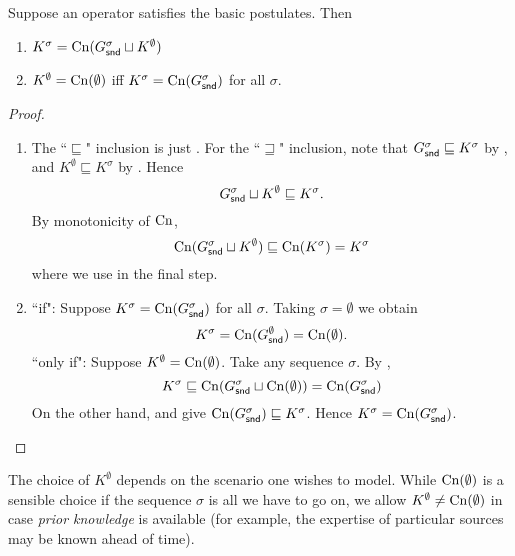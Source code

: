 \begin{proposition}
    \label{kr_prop_prior_knowledge}
    Suppose an operator satisfies the basic postulates. Then
    \begin{enumerate}
        \item $K^\sigma = \operatorname{Cn}(G^\sigma_{\mathsf{snd}} \sqcup K^\emptyset)$
        \item $K^\emptyset = \operatorname{Cn}(\emptyset)$ iff $K^\sigma =
              \operatorname{Cn}(G^\sigma_{\mathsf{snd}})$ for all $\sigma$.
    \end{enumerate}
\end{proposition}

\begin{proof}
    \leavevmode
    \begin{enumerate}
        \item The ``$\sqsubseteq$" inclusion is just \kbound{}.
              For the ``$\sqsupseteq$" inclusion, note that $G^\sigma_{\mathsf{snd}}
              \sqsubseteq K^\sigma$ by \soundness{}, and $K^\emptyset
              \sqsubseteq K^\sigma$ by \priorext{}. Hence
              \[
                  G^\sigma_{\mathsf{snd}} \sqcup K^\emptyset
                  \sqsubseteq
                  K^\sigma.
              \]
              By monotonicity of $\operatorname{Cn}$,
              \[
                  \operatorname{Cn}(G^\sigma_{\mathsf{snd}} \sqcup K^\emptyset)
                  \sqsubseteq
                  \operatorname{Cn}(K^\sigma)
                  = K^\sigma
              \]
              where we use \closure{} in the final step.

          \item ``if": Suppose $K^\sigma = \operatorname{Cn}(G^\sigma_{\mathsf{snd}})$ for all
                $\sigma$. Taking $\sigma = \emptyset$ we obtain
                \[
                    K^\sigma = \operatorname{Cn}(G^\emptyset_{\mathsf{snd}}) = \operatorname{Cn}(\emptyset).
                \]
                ``only if": Suppose $K^\emptyset = \operatorname{Cn}(\emptyset)$. Take any
                sequence $\sigma$. By \kbound{},
                \[
                    K^\sigma
                    \sqsubseteq \operatorname{Cn}(G^\sigma_{\mathsf{snd}} \sqcup \operatorname{Cn}(\emptyset))
                    = \operatorname{Cn}(G^\sigma_{\mathsf{snd}})
                \]
                On the other hand, \soundness{} and \closure{} give
                $\operatorname{Cn}(G^\sigma_{\mathsf{snd}}) \sqsubseteq K^\sigma$. Hence $K^\sigma =
                \operatorname{Cn}(G^\sigma_{\mathsf{snd}})$.
    \end{enumerate}
\end{proof}

The choice of $K^\emptyset$ depends on the scenario one wishes to model.
While $\operatorname{Cn}(\emptyset)$ is a sensible choice if the sequence $\sigma$ is all we
have to go on, we allow $K^\emptyset \ne \operatorname{Cn}(\emptyset)$ in case \emph{prior
knowledge} is available (for example, the expertise of particular sources may
be known ahead of time).

